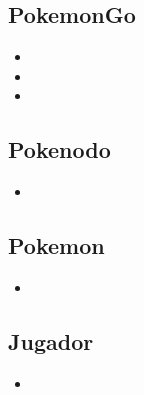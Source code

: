 
\subsection{PokemonGo}

\begin{itemize}
\item{}

\item{}

\item{}

\end{itemize}


\subsection{Pokenodo}

\begin{itemize}
\item{}
\end{itemize}

\subsection{Pokemon}

\begin{itemize}
\item{}
\end{itemize}

\subsection{Jugador}

\begin{itemize}
\item{}
\end{itemize}

